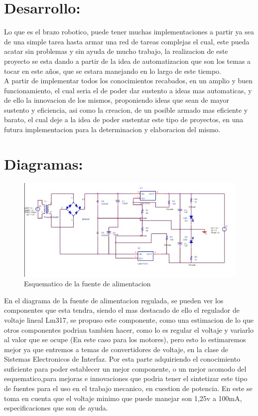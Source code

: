 \documentclass[14pt,a4paper]{article}
\begin{document}
\section{Desarrollo:}

Lo que es el brazo robotico, puede tener muchas implementaciones a partir ya sea de una simple tarea hasta armar una red de tareas complejas el cual, este pueda acatar sin problemas y sin ayuda de mucho trabajo, la realizacion de este proyecto se esta dando a partir de la idea de automatizacion que son los temas a tocar en este años, que se estara manejando en lo largo de este tiempo.\\
A partir de implementar todos los conocimientos recabados, en un amplio y buen funcionamiento, el cual seria el de poder dar sustento a ideas mas automaticas, y de ello la innovacion de los mismos, proponiendo ideas que sean de mayor sustento y eficiencia, asi como la creacion, de un posible armado mas eficiente y barato, el cual deje a la idea de poder sustentar este tipo de proyectos, en una futura implementacion para la determinacion y elaboracion del mismo.

\section{Diagramas:}
\begin{figure}[hbtp]
\centering
\includegraphics[width=12cm]{Fuente.jpeg}
\caption{Esquematico de la fuente de alimentacion}
\end{figure}

En el diagrama de la fuente de alimentacion regulada, se pueden ver los componentes que esta tendra, siendo el mas destacado de ello el regulador de voltaje lineal Lm317, se propuso este componente, como una estimacion de lo que otros componentes podrian tambien hacer, como lo es regular el voltaje y variarlo al valor que se ocupe (En este caso para los motores), pero esto lo estimaremos mejor ya que entremos a temas de convertidores de voltaje, en la clase de Sistemas Electronicos de Interfaz. Por esta parte adquiriendo el conocimiento suficiente para poder establecer un mejor componente, o un mejor acomodo del esquematico,para mejoras e innovaciones que podria tener el sintetizar este tipo de fuentes para el uso en el trabajo mecanico, en cuestion de potencia. En este se toma en cuenta que el voltaje minimo que puede manejar son 1,25v a 100mA, especificaciones que son de ayuda.
\end{document}
